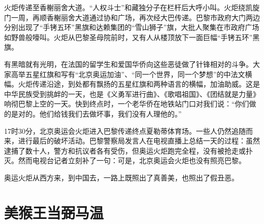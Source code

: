 \documentclass[12pt,UTF-8,openany]{ctexbook}
\begin{document}
\begin{large}
    火炬传递至香榭丽舍大道。“人权斗士”和藏独分子在栏杆后大呼小叫。火炬绕凯旋门一周，再顺香榭丽舍大道通过协和广场，再次经大巴传递。巴黎市政府大门两边分别出现了“手铐五环”黑旗和达赖集团的“雪山狮子”旗，大批人聚集在市政府广场如野兽般嚎叫。火炬从巴黎圣母院前时，又有人从楼顶放下一面巨幅“手铐五环”黑旗。
    
    有黑暗就有光明，在法国的留学生和爱国华侨向这些恶徒做了针锋相对的斗争。大家高举五星红旗和写有“北京奥运加油”、“同一个世界，同一个梦想”的中法文横幅。火炬传递沿途，到处都有飘扬的五星红旗和两种语言的横幅，加油助威。这是中华民族受到挑衅的一天，也是《义勇军进行曲》、《歌唱祖国》、《团结就是力量》响彻巴黎上空的一天。快到终点时，一个老华侨在地铁站门口对我们说：“你们做的是对的。他们给钱我们去做坏事，我们没有人理他的。”
    
    17时30分，北京奥运会火炬进入巴黎传递终点夏勒蒂体育场。一些人仍然追随而来，进行最后的破坏活动。巴黎警察局发言人在电视直播上总结一天的过程：虽然逮捕了数十人，警方和抗议者各有受伤，但奥运火炬跑完全程，没有被抢走或扑灭。然而电视台记者立刻补了一句：可是，北京奥运会火炬也没有照亮巴黎。
    
    奥运火炬从西方来，到中国去，一路上既照出了真善美，也照出了假丑恶。
    
\end{large}



\chapter{美猴王当弼马温}
\end{document}
